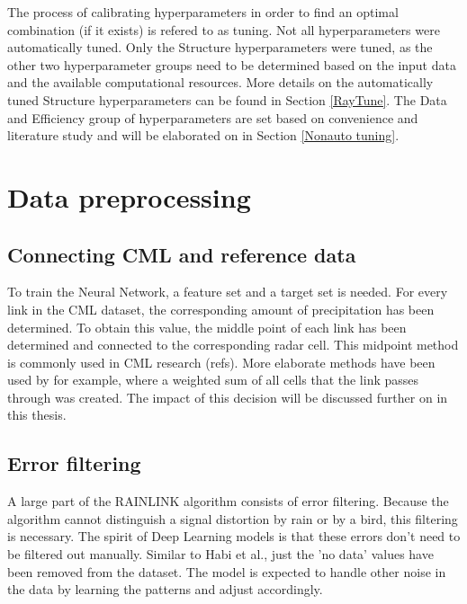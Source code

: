 \documentclass[twocolumn, 10pt, a4paper]{memoir}
\begin{document}
		The process of calibrating hyperparameters in order to find an optimal combination (if it exists) is refered to as tuning. Not all hyperparameters were automatically tuned. Only the Structure hyperparameters were tuned, as the other two hyperparameter groups need to be determined based on the input data and the available computational resources. More details on the automatically tuned Structure hyperparameters can be found in Section \ref{RayTune}. The Data and Efficiency group of hyperparameters are set based on convenience and literature study and will be elaborated on in Section \ref{Nonauto tuning}.
		
	\section{Data preprocessing} \label{datapreprocess}
		\subsection{Connecting CML and reference data}
		To train the Neural Network, a feature set and a target set is needed. For every link in the CML dataset, the corresponding amount of precipitation has been determined. To obtain this value, the middle point of each link has been determined and connected to the corresponding radar cell. This midpoint method is commonly used in CML research (refs). More elaborate methods have been used by  for example, where a weighted sum of all cells that the link passes through was created. The impact of this decision will be discussed further on in this thesis. 
		\subsection{Error filtering}
		A large part of the RAINLINK algorithm consists of error filtering. Because the algorithm cannot distinguish a signal distortion by rain or by a bird, this filtering is necessary. The spirit of Deep Learning models is that these errors don't need to be filtered out manually. Similar to Habi et al., just the 'no data' values have been removed from the dataset. The model is expected to handle other noise in the data by learning the patterns and adjust accordingly.
\end{document}

